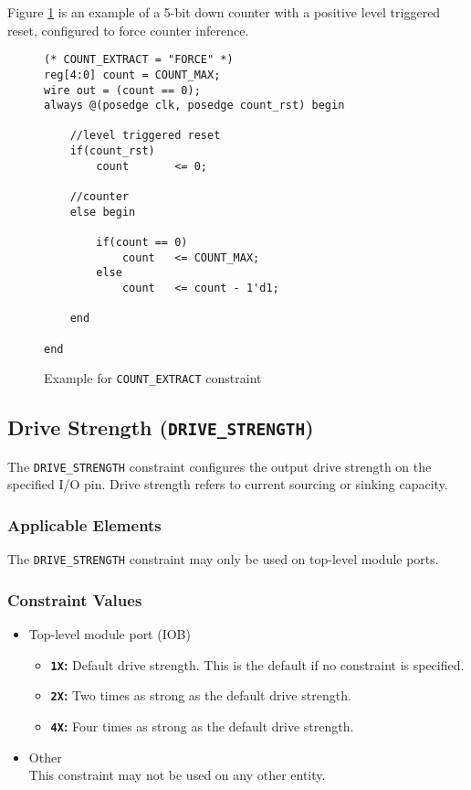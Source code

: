 \documentclass[11pt]{article}
\newcommand{\tokenstyle}[1]{\texttt{#1}}
\newcommand{\valuestyle}[1]{\texttt{#1}}
\newcommand{\strvaluestyle}[1]{\valuestyle{\textquotedbl#1\textquotedbl}}
\newcommand{\strexamplestyle}[1]{\textbf{\strvaluestyle{#1}:}}
\newcommand{\whenstyle}[1]{{\fontseries{sb}\selectfont#1}}
\begin{document}
Figure \ref{constraint-count-extract} is an example of a 5-bit down counter with a positive level triggered reset,
configured to force counter inference.

\begin{figure}[h]
\begin{lstlisting}
(* COUNT_EXTRACT = "FORCE" *)
reg[4:0] count = COUNT_MAX;
wire out = (count == 0);
always @(posedge clk, posedge count_rst) begin

	//level triggered reset
	if(count_rst)
		count		<= 0;

	//counter
	else begin

		if(count == 0)
			count	<= COUNT_MAX;
		else
			count	<= count - 1'd1;

	end

end
\end{lstlisting}
\caption{Example for \tokenstyle{COUNT\_EXTRACT} constraint}
\label{constraint-count-extract}
\end{figure}


\pagebreak
\subsection{Drive Strength (\tokenstyle{DRIVE\_STRENGTH})}

The \tokenstyle{DRIVE\_STRENGTH} constraint configures the output drive strength on the specified I/O pin. Drive strength refers to current sourcing or sinking capacity.

\subsubsection{Applicable Elements}
The \tokenstyle{DRIVE\_STRENGTH} constraint may only be used on top-level module ports.

\subsubsection{Constraint Values}
\begin{itemize}
\item \whenstyle{Top-level module port (IOB)}
	\begin{itemize}
		\item \strexamplestyle{1X} Default drive strength. This is the default if no constraint is specified.
		\item \strexamplestyle{2X} Two times as strong as the default drive strength.
		\item \strexamplestyle{4X} Four times as strong as the default drive strength.
	\end{itemize}
\item \whenstyle{Other} \\
This constraint may not be used on any other entity.
\end{itemize}
\end{document}
